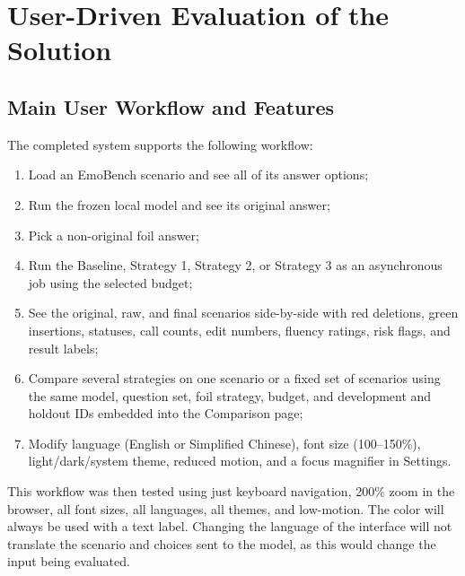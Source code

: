 \documentclass[11pt,a4paper]{article}
\begin{document}
\section{User-Driven Evaluation of the Solution}

\subsection{Main User Workflow and Features}

The completed system supports the following workflow:

\begin{enumerate}
  \item Load an EmoBench scenario and see all of its answer options;
  \item Run the frozen local model and see its original answer;
  \item Pick a non-original foil answer;
  \item Run the Baseline, Strategy 1, Strategy 2, or Strategy 3 as an asynchronous job using the selected budget;
  \item See the original, raw, and final scenarios side-by-side with red deletions, green insertions,
statuses, call counts, edit numbers, fluency ratings, risk flags, and result labels;
  \item Compare several strategies on one scenario or a fixed set of scenarios using the same model, question
set, foil strategy, budget, and development and holdout IDs embedded into the Comparison page;
  \item Modify language (English or Simplified Chinese), font size (100--150\%),
  light/dark/system theme, reduced motion, and a focus magnifier in Settings.
\end{enumerate}

This workflow was then tested using just keyboard navigation, 200\% zoom in the
browser, all font sizes, all languages, all themes, and low-motion. The color will
always be used with a text label. Changing the language of the interface will not
translate the scenario and choices sent to the model, as this would change the
input being evaluated.
\end{document}
